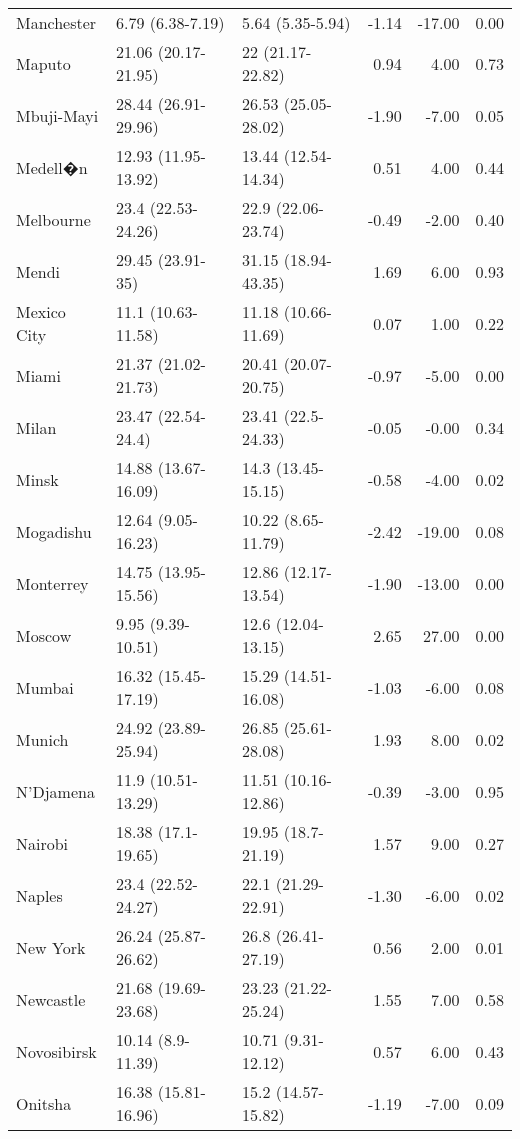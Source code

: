 \begin{longtable}{lllrrr}
  Manchester & 6.79
 (6.38-7.19) & 5.64
 (5.35-5.94) & -1.14 & -17.00 & 0.00 \\ 
  Maputo & 21.06
 (20.17-21.95) & 22
 (21.17-22.82) & 0.94 & 4.00 & 0.73 \\ 
  Mbuji-Mayi & 28.44
 (26.91-29.96) & 26.53
 (25.05-28.02) & -1.90 & -7.00 & 0.05 \\ 
  Medell�n & 12.93
 (11.95-13.92) & 13.44
 (12.54-14.34) & 0.51 & 4.00 & 0.44 \\ 
  Melbourne & 23.4
 (22.53-24.26) & 22.9
 (22.06-23.74) & -0.49 & -2.00 & 0.40 \\ 
  Mendi & 29.45
 (23.91-35) & 31.15
 (18.94-43.35) & 1.69 & 6.00 & 0.93 \\ 
  Mexico City & 11.1
 (10.63-11.58) & 11.18
 (10.66-11.69) & 0.07 & 1.00 & 0.22 \\ 
  Miami & 21.37
 (21.02-21.73) & 20.41
 (20.07-20.75) & -0.97 & -5.00 & 0.00 \\ 
  Milan & 23.47
 (22.54-24.4) & 23.41
 (22.5-24.33) & -0.05 & -0.00 & 0.34 \\ 
  Minsk & 14.88
 (13.67-16.09) & 14.3
 (13.45-15.15) & -0.58 & -4.00 & 0.02 \\ 
  Mogadishu & 12.64
 (9.05-16.23) & 10.22
 (8.65-11.79) & -2.42 & -19.00 & 0.08 \\ 
  Monterrey & 14.75
 (13.95-15.56) & 12.86
 (12.17-13.54) & -1.90 & -13.00 & 0.00 \\ 
  Moscow & 9.95
 (9.39-10.51) & 12.6
 (12.04-13.15) & 2.65 & 27.00 & 0.00 \\ 
  Mumbai & 16.32
 (15.45-17.19) & 15.29
 (14.51-16.08) & -1.03 & -6.00 & 0.08 \\ 
  Munich & 24.92
 (23.89-25.94) & 26.85
 (25.61-28.08) & 1.93 & 8.00 & 0.02 \\ 
  N'Djamena & 11.9
 (10.51-13.29) & 11.51
 (10.16-12.86) & -0.39 & -3.00 & 0.95 \\ 
  Nairobi & 18.38
 (17.1-19.65) & 19.95
 (18.7-21.19) & 1.57 & 9.00 & 0.27 \\ 
  Naples & 23.4
 (22.52-24.27) & 22.1
 (21.29-22.91) & -1.30 & -6.00 & 0.02 \\ 
  New York & 26.24
 (25.87-26.62) & 26.8
 (26.41-27.19) & 0.56 & 2.00 & 0.01 \\ 
  Newcastle & 21.68
 (19.69-23.68) & 23.23
 (21.22-25.24) & 1.55 & 7.00 & 0.58 \\ 
  Novosibirsk & 10.14
 (8.9-11.39) & 10.71
 (9.31-12.12) & 0.57 & 6.00 & 0.43 \\ 
  Onitsha & 16.38
 (15.81-16.96) & 15.2
 (14.57-15.82) & -1.19 & -7.00 & 0.09 \\ 

\end{longtable}
